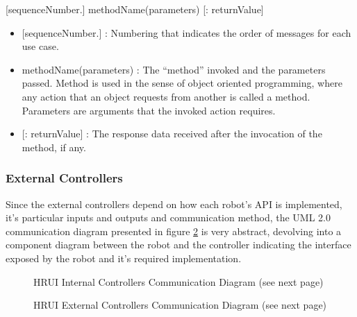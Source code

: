 \centerline{[sequenceNumber.] methodName(parameters) [: returnValue]}
\begin{itemize}
	\item {[}sequenceNumber.{]} : Numbering that indicates the order of messages for each use case.
	\item methodName(parameters) : The ``method'' invoked and the parameters passed. Method is used in the sense of object 
	oriented programming, where any action that an object requests from another is called a method. Parameters are 
	arguments that the invoked action requires.
	\item {[}: returnValue{]} : The response data received after the invocation of the method, if any.
\end{itemize}
\subsubsection{External Controllers}
Since the external controllers depend on how each robot's API is implemented, it's particular inputs and outputs and 
communication method, the UML 2.0 communication diagram presented in figure \ref{extcontrollerarch} is very abstract, 
devolving into a component diagram between the robot and the controller indicating the interface exposed by the robot and 
it's required implementation.
\begin{figure}[H]
\caption{HRUI Internal Controllers Communication Diagram (see next page)\label{controllerarch}}
\end{figure}
\begin{figure}[H]
\caption{HRUI External Controllers Communication Diagram (see next page)\label{extcontrollerarch}}
\end{figure}


